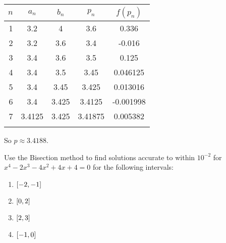\documentclass[../../Assignments.tex]{subfiles}
\begin{document}
\begin{solution}
\begin{enumerate}[label=(\alph*)]
            \begin{tabular}{r S[table-format=1.5] S[table-format=1.6] S[table-format=1.6] S[table-format=-1.6]}
                \\
                \toprule
                \(n\)  &  {\(a_n\)}  &  {\(b_n\)}  &  {\(p_n\)}  &  {\(f(p_n)\)}  \\
                  &  3.2        &  4          &  3.6        &   0.336        \\
                    2  &  3.2        &  3.6        &  3.4        &  -0.016        \\
                    3  &  3.4        &  3.6        &  3.5        &   0.125        \\
                    4  &  3.4        &  3.5        &  3.45       &   0.046125     \\
                    5  &  3.4        &  3.45       &  3.425      &   0.013016     \\
                    6  &  3.4        &  3.425      &  3.4125     &  -0.001998     \\
                    7  &  3.4125     &  3.425      &  3.41875    &   0.005382     \\
                \bottomrule
                \\
            \end{tabular}

            So \(p \approx \num{3.4188}\).
    \end{enumerate}
\end{solution}

\begin{exercise}
    Use the Bisection method to find solutions accurate to within \(10^{-2}\)
    for \(x^4 - 2x^3 - 4x^2 + 4x + 4 = 0\) for the following intervals:

    \begin{enumerate}[label=(\alph*)]
        \item \(\interval{-2}{-1}\)
        \item \(\interval{0}{2}\)
        \item \(\interval{2}{3}\)
        \item \(\interval{-1}{0}\)
    \end{enumerate}
\end{exercise}
\end{document}
